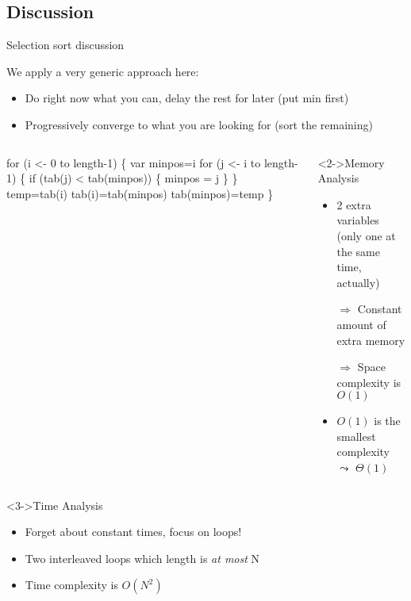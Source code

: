\subsection{Discussion}
\begin{frame}[fragile]{Selection sort discussion}
  \begin{block}{We apply a very generic approach here:}
    \begin{itemize}
    \item Do right now what you can, delay the rest for later (put min first)
    \item Progressively converge to what you are looking for (sort the remaining)
    \end{itemize}
  \end{block}

  \begin{columns}
    \begin{column}{.37\linewidth}
        \begin{boitecode}{}
for (i <- 0 to length-1) \{
  var minpos=i
  for (j <- i to length-1) \{
    if (tab(j) < tab(minpos)) \{
      minpos = j
    \}
  \}
  temp=tab(i)
  tab(i)=tab(minpos)
  tab(minpos)=temp
\}
        \end{boitecode}
    \end{column}

    \begin{column}{.6\linewidth}
      \begin{block}<2->{Memory Analysis}
        \begin{itemize}
        \item 2 extra variables\\
          {\small(only one at the same time, actually)}
        \item[$\Rightarrow$] Constant amount of extra memory
        \item[$\Rightarrow$] Space complexity is $O(1)$
        \item $O(1)$ is the smallest complexity $\leadsto$ $\Theta(1)$
        \end{itemize}
      \end{block}      
    \end{column}
  \end{columns}
  
  \begin{block}<3->{Time Analysis}
    \begin{itemize}
    \item Forget about constant times, focus on loops!
    \item<4-> Two interleaved loops which length is \textit{at most} N
    \item<5->[$\Rightarrow$] Time complexity is $O(N^2)$
    \end{itemize}
  \end{block}
\end{frame}
